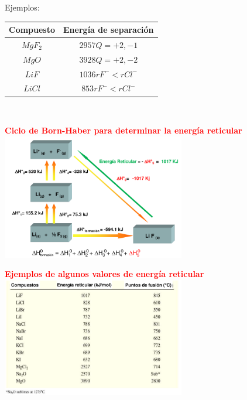         \sangria{} Ejemplos:
        \begin{center}
            \begin{tabular}{| c | c |}
                \toprule
                \textbf{Compuesto} & \textbf{Energía de separación} \\
                \midrule
                \midrule
                $MgF_2$ & $2957 Q = +2, -1$ \\
                \midrule
                $MgO$ & $3928 Q= +2, -2$ \\
                \midrule
                $LiF$ & $1036 rF^- < r Cl^-$ \\
                \midrule
                $LiCl$ & $853 rF^- < r Cl^-$ \\
                \bottomrule
            \end{tabular} \\[1cm]
        \end{center} 
        \begin{center} \textcolor{red}{\textbf{Ciclo de Born-Haber para determinar la energía reticular}} \\ \includegraphics[width=8cm]{./imagenes/cicloBornHaberEnergiaReticular.png} \end{center}
        \begin{center} \textcolor{red}{\textbf{Ejemplos de algunos valores de energía reticular}} \\ \includegraphics[width=8cm]{./imagenes/ejemplosEnergiaReticular.png} \end{center}
    \saltoPag{}
